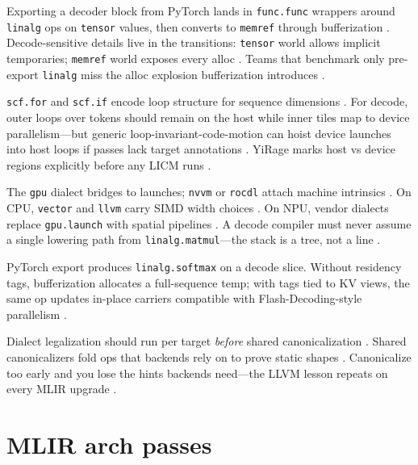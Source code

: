 Exporting a decoder block from PyTorch lands in \texttt{func.func} wrappers around \texttt{linalg} ops on \texttt{tensor} values, then converts to \texttt{memref} through bufferization \citep{chen2020compilerbasedhardw,yirage2026}. Decode-sensitive details live in the transitions: \texttt{tensor} world allows implicit temporaries; \texttt{memref} world exposes every alloc \citep{memoryfloor2026}. Teams that benchmark only pre-export \texttt{linalg} miss the alloc explosion bufferization introduces \citep{kwon2023vllm,taxbreak2026}.

\texttt{scf.for} and \texttt{scf.if} encode loop structure for sequence dimensions \citep{dao2023flashdecoding}. For decode, outer loops over tokens should remain on the host while inner tiles map to device parallelism---but generic loop-invariant-code-motion can hoist device launches into host loops if passes lack target annotations \citep{nvidia2024cudagraphs,yirage2026}. YiRage marks host vs device regions explicitly before any LICM runs \citep{yirage2026,patel2025llminference}.

The \texttt{gpu} dialect bridges to launches; \texttt{nvvm} or \texttt{rocdl} attach machine intrinsics \citep{nvidia2022hopper}. On CPU, \texttt{vector} and \texttt{llvm} carry SIMD width choices \citep{dlbook}. On NPU, vendor dialects replace \texttt{gpu.launch} with spatial pipelines \citep{amd2024aie,amd2024xdna}. A decode compiler must never assume a single lowering path from \texttt{linalg.matmul}---the stack is a tree, not a line \citep{chen2020compilerbasedhardw}.

\begin{example}
PyTorch export produces \texttt{linalg.softmax} on a decode slice. Without residency tags, bufferization allocates a full-sequence temp; with tags tied to KV views, the same op updates in-place carriers compatible with Flash-Decoding-style parallelism \citep{dao2022flashattention,dao2023flashdecoding,yirage2026}.
\end{example}

Dialect legalization should run per target \emph{before} shared canonicalization \citep{yirage2026}. Shared canonicalizers fold ops that backends rely on to prove static shapes \citep{amd2024xdna}. Canonicalize too early and you lose the hints backends need---the LLVM lesson repeats on every MLIR upgrade \citep{chen2020compilerbasedhardw,memoryfloor2026}.

\section{MLIR arch passes}
\label{sec:ch14_mlir_arch_passes}

